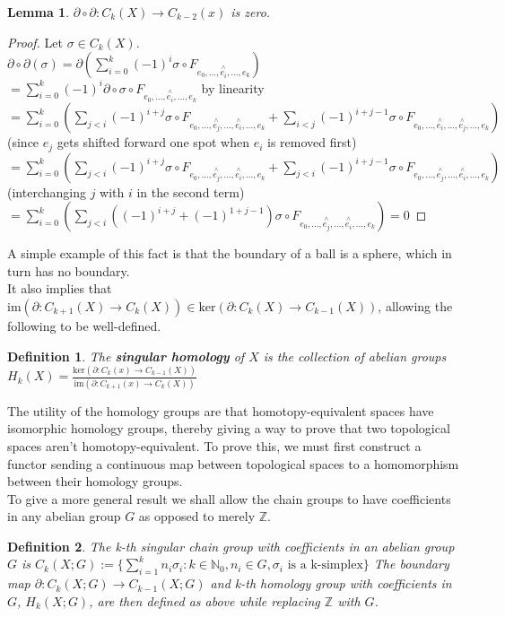 \documentclass{report}
\newtheorem{definition}{Definition}
\newtheorem{lemma}{Lemma}
\begin{document}
\begin{lemma}
$\partial\circ\partial\colon C_k(X)\to C_{k-2}(x)$ is zero.
\end{lemma}
\begin{proof}
Let $\sigma\in C_k(X)$.\\
$\partial\circ\partial (\sigma)=\partial(\sum_{i=0}^k(-1)^i\sigma\circ F_{e_0,...,\overset{\wedge}{e_i},...,e_k})$\\
$=\sum_{i=0}^k(-1)^i\partial\circ\sigma\circ F_{e_0,...,\overset{\wedge}{e_i},...,e_k}$ by linearity\\
$=\sum_{i=0}^k(\sum_{j<i}(-1)^{i+j}\sigma\circ F_{e_0,...,\overset{\wedge}{e_j},...,\overset{\wedge}{e_i},...,e_k} + \sum_{i<j}(-1)^{i+j-1}\sigma\circ F_{e_0,...,\overset{\wedge}{e_i},...,\overset{\wedge}{e_j},...,e_k})$ (since $e_j$ gets shifted forward one spot when $e_i$ is removed first)\\
$=\sum_{i=0}^k(\sum_{j<i}(-1)^{i+j}\sigma\circ F_{e_0,...,\overset{\wedge}{e_j},...,\overset{\wedge}{e_i},...,e_k} + \sum_{j<i}(-1)^{i+j-1}\sigma\circ F_{e_0,...,\overset{\wedge}{e_j},...,\overset{\wedge}{e_i},...,e_k})$
(interchanging $j$ with $i$ in the second term)\\
$=\sum_{i=0}^k(\sum_{j<i}((-1)^{i+j}+(-1)^{1+j-1})\sigma\circ F_{e_0,...,\overset{\wedge}{e_j},...,\overset{\wedge}{e_i},...,e_k})=0$
\end{proof}

\noindent A simple example of this fact is that the boundary of a ball is a sphere, which in turn has no boundary.\\
It also implies that $\text{im}(\partial:C_{k+1}(X)\rightarrow C_k(X))\in\text{ker}(\partial:C_{k}(X)\rightarrow C_{k-1}(X))$,
allowing the following to be well-defined.
\begin{definition}
The \textbf{singular homology} of $X$ is the collection of abelian groups
$H_k(X)=\frac{\text{ker}(\partial:C_{k}(x)\rightarrow C_{k-1}(X))}{\text{im}(\partial:C_{k+1}(x)\rightarrow C_k(X))}$
\end{definition}

\noindent The utility of the homology groups are that homotopy-equivalent spaces have isomorphic homology groups, thereby giving a way to prove that two topological spaces aren't homotopy-equivalent. To prove this, we must first construct a functor sending a continuous map between topological spaces to a homomorphism between their homology groups.\\

\noindent To give a more general result we shall allow the chain groups to have coefficients in any abelian group $G$ as opposed to merely $\mathbb{Z}$.
\begin{definition}
The k-th singular chain group with coefficients in an abelian group $G$ is $C_k(X;G):=\{\sum_{i=1}^kn_i\sigma_i:k\in\mathbb{N}_0,n_i\in G,\sigma_i \text{ is a k-simplex}\}$ The boundary map $\partial\colon C_k(X;G)\to C_{k-1}(X;G)$ and k-th homology group with coefficients in $G$, $H_k(X;G)$, are then defined as above while replacing $\mathbb{Z}$ with $G$.
\end{definition}
\end{document}
